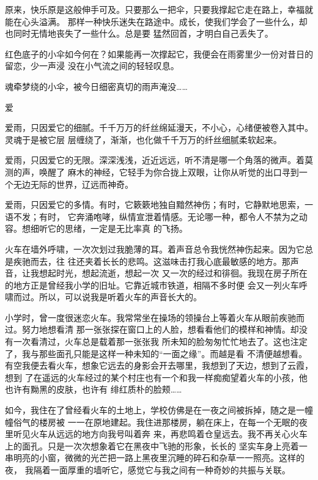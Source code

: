 \documentclass[12pt,a4paper]{article}
\newcommand{\subpart}[1]{
	\begingroup \par
	\vspace{1ex} \centering #1
	\par \endgroup
}
\begin{document}
		原来，快乐原是这般伸手可及。只要那么一把伞，只要我撑起它走在路上，幸福就能在心头溢满。
	那样一种快乐迷失在路途中。成长，使我们学会了一些什么，却也同时无情地丧失了一些什么。总是要
	猛然回首，才明白自己丢失了。

		红色底子的小伞如今何在？如果能再一次撑起它，我便会在雨雾里少一份对昔日的留恋，少一声浸
	没在小气流之间的轻轻叹息。

		魂牵梦绕的小伞，被今日细密真切的雨声淹没……

		\subpart{爱}
		爱雨，只因爱它的细腻。千千万万的纤丝绵延漫天，不小心，心绪便被卷入其中。灵魂于是被它层
	层缠绕了，渐渐，也化做千千万万的纤丝细腻柔软起来。

		爱雨，只因爱它的无限。深深浅浅，近近远远，听不清是哪一个角落的微声。着莫测的声，唤醒了
	麻木的神经，它轻手为你合拢上双眼，让你从听觉的出口寻到一个无边无际的世界，辽远而神奇。

		爱雨，只因爱它的多情。有时，它簌簌地独自黯然神伤；有时，它静默地思索，一语不发；有时，
	它奔涌咆哮，纵情宣泄着情感。无论哪一种，都令人不禁为之动容。想细听它的思绪，一定是无比率真
	的飞扬。

	\endwriting



		火车在墙外呼啸，一次次划过我脆薄的耳。着声音总令我恍然神伤起来。因为它总是疾驰而去，往
	往还夹着长长的悲鸣。这滋味击打我心底最敏感的地方。那声音，让我想起时光，想起流逝，想起一次
	又一次的经过和徘徊。我现在房子所在的地方正是曾经我小学的旧址。它靠近城市铁道，相隔不多时便
	会又一列火车呼啸而过。所以，可以说我是听着火车的声音长大的。

		小学时，曾一度很迷恋火车。我常常坐在操场的领操台上等着火车从眼前疾驰而过。努力地想看清
	那一张张探在窗口上的人脸，想看看他们的模样和神情。却没有一次看清过，火车总是载着那一张张我
	所未知的脸匆匆忙忙地去了。这也注定了，我与那些面孔只能是这样一种未知的“一面之缘”。而越是看
	不清便越想看。有空我便去看火车，想象它远去的身影会开去哪里，我想到了天边，想到了云霞，想到
	了在遥远的火车经过的某个村庄也有一个和我一样痴痴望着火车的小孩，他也许有黝黑的皮肤，也许有
	绯红质朴的脸颊……

		如今，我住在了曾经看火车的土地上，学校仿佛是在一夜之间被拆掉，随之是一幢幢俗气的楼房被
	一一在原地建起。我住进那楼房，躺在床上，在每一个无眠的夜里听见火车从远远的地方向我号叫着奔
	来，再悲鸣着仓皇远去。我不再关心火车上的面孔。只是一次次想象着它在黑夜中飞驰的形象，长长的
	坚实车身上亮着一串明亮的小窗，微微的光芒把一路上黑夜里沉睡的碎石和杂草一一照亮。这样的夜，
	我隔着一面厚重的墙听它，感觉它与我之间有一种奇妙的共振与关联。
\end{document}
